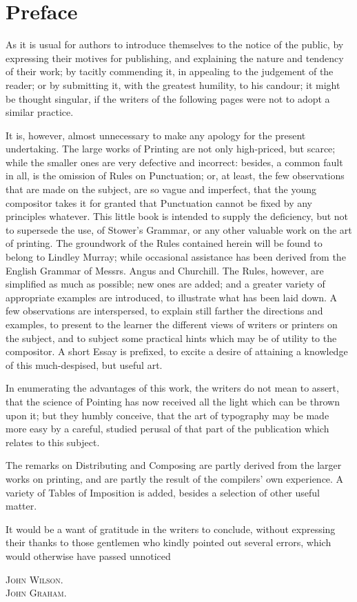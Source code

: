 \section*{Preface}
As it is usual for authors to introduce themselves to the notice of the public,
by expressing their motives for publishing, and explaining the nature and
tendency of their work; by tacitly commending it, in appealing to the judgement
of the reader; or by submitting it, with the greatest humility, to his candour;
it might be thought singular, if the writers of the following pages were not to
adopt a similar practice.

It is, however, almost unnecessary to make any apology for the present
undertaking. The large works of Printing are not only high-priced, but scarce;
while the smaller ones are very defective and incorrect: besides, a common fault
in all, is the omission of Rules on Punctuation; or, at least, the few
observations that are made on the subject, are so vague and imperfect, that the
young compositor takes it for granted that Punctuation cannot be fixed by any
principles whatever. This little book is intended to supply the deficiency, but
not to supersede the use, of Stower's Grammar, or any other valuable work on the
art of printing. The groundwork of the Rules contained herein will be found to
belong to Lindley Murray; while occasional assistance has been derived from the
English Grammar of Messrs. Angus and Churchill. The Rules, however, are
simplified as much as possible; new ones are added; and a greater variety of
appropriate examples are introduced, to illustrate what has been laid down.
A few observations are interspersed, to explain still farther the directions and
examples, to present to the learner the different views of writers or printers
on the subject, and to subject some practical hints which may be of utility to
the compositor. A short Essay is prefixed, to excite a desire of attaining a
knowledge of this much-despised, but useful art.

In enumerating  the advantages of this work, the writers do not mean to assert,
that the science of Pointing has now received all the light which can be thrown
upon it; but they humbly conceive, that the art of typography may be made more
easy by a careful, studied perusal of that part of the publication which relates
to this subject.

The remarks on Distributing and Composing are partly derived from the larger
works on printing, and are partly the result of the compilers' own experience.
A variety of Tables of Imposition is added, besides a selection of other useful
matter.

It would be a want of gratitude in the writers to conclude, without expressing
their thanks to those gentlemen who kindly pointed out several errors, which would
otherwise have passed unnoticed
\begin{flushright}
    \scshape
    John Wilson.\\
    John Graham.
    \rmfamily
\end{flushright}
